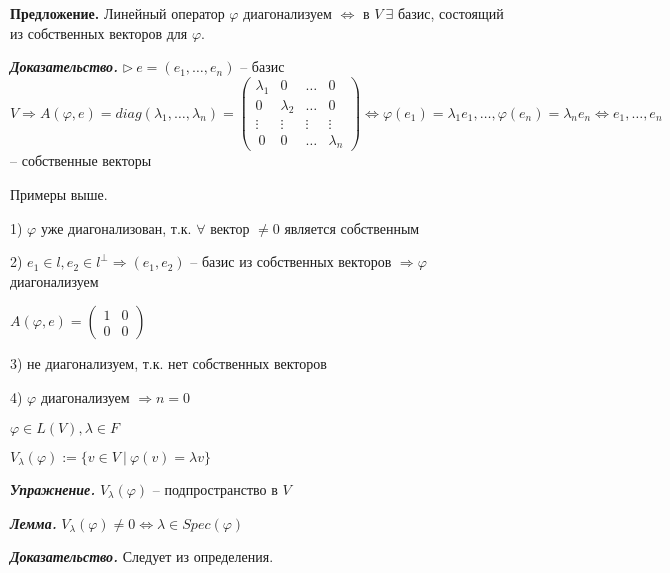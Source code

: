 \vspace{\baselineskip}
\textbf{Предложение.} Линейный оператор $\varphi$ диагонализуем $\Leftrightarrow$ в $V \ \exists$ базис, состоящий из собственных векторов для $\varphi$.

\vspace{\baselineskip}
\textbf{\textit{Доказательство.}} $\rhd \ e = (e_1, \dots, e_n)$ -- базис $V \Rightarrow A(\varphi, e) = diag(\lambda_1, \dots, \lambda_n) = \begin{pmatrix} \lambda_1 & 0 & \dots & 0 \\ 0 & \lambda_2 & \dots & 0 \\ \vdots & \vdots & \vdots & \vdots \\ \ 0 & 0 & \dots & \lambda_n \end{pmatrix} \Leftrightarrow \varphi(e_1) = \lambda_1 e_1, \dots, \varphi(e_n) = \lambda_n e_n \Leftrightarrow e_1, \dots, e_n$ -- собственные векторы

\vspace{\baselineskip}
Примеры выше.

1) $\varphi$ уже диагонализован, т.к. $\forall$ вектор $\neq 0$ является собственным

2) $e_1 \in l, e_2 \in l^{\bot} \Rightarrow (e_1, e_2)$ -- базис из собственных векторов $\Rightarrow \varphi$ диагонализуем

$A(\varphi, e) = \begin{pmatrix} 1 & 0 \\ 0 & 0 \end{pmatrix}$

3) не диагонализуем, т.к. нет собственных векторов

4) $\varphi$ диагонализуем $\Rightarrow n = 0$

\vspace{\baselineskip}
$\varphi \in L(V), \lambda \in F$

$V_{\lambda} (\varphi) := \{v \in V \ | \ \varphi(v) = \lambda v \}$

\vspace{\baselineskip}
\textbf{\textit{Упражнение.}} $V_{\lambda} (\varphi)$ -- подпространство в $V$

\vspace{\baselineskip}
\textbf{\textit{Лемма.}} $V_{\lambda} (\varphi) \neq 0 \Leftrightarrow \lambda \in Spec(\varphi)$

\vspace{\baselineskip}
\textbf{\textit{Доказательство.}} Следует из определения.

